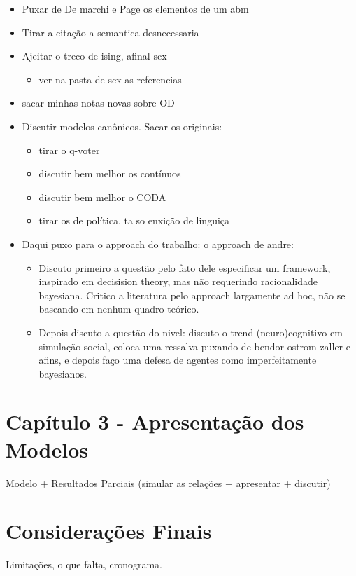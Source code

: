 \documentclass{article}
\begin{document}
\begin{itemize}
  \item Puxar de De marchi e Page os elementos de um abm
  \item Tirar a citação a semantica desnecessaria
  \item Ajeitar o treco de ising, afinal scx
    \begin{itemize}
    \item ver na pasta de scx as referencias
    \end{itemize}
  \item sacar minhas notas novas sobre OD
\item Discutir modelos canônicos. {\Large Sacar os originais}:
  \begin{itemize}
  \item tirar o q-voter
  \item discutir bem melhor os contínuos
  \item discutir bem melhor o CODA
  \item tirar os de política, ta so enxição de linguiça
  \end{itemize}

\item Daqui puxo para o approach do trabalho: o approach de andre:
  
  \begin{itemize}
  \item Discuto primeiro a questão pelo fato dele especificar um framework,
    inspirado em decisision theory, mas não requerindo racionalidade bayesiana.
    Critico a literatura pelo approach largamente ad hoc, não se baseando em
    nenhum quadro teórico.
  \item Depois discuto a questão do nivel: discuto o trend (neuro)cognitivo em
    simulação social, coloca uma ressalva puxando de bendor ostrom zaller e
    afins, e depois faço uma defesa de agentes como imperfeitamente bayesianos.
  \end{itemize}
\end{itemize}


\section*{Capítulo 3 - Apresentação dos Modelos}

Modelo + Resultados Parciais (simular as relações + apresentar + discutir)




\section*{Considerações Finais}

Limitações, o que falta, cronograma.
\end{document}
